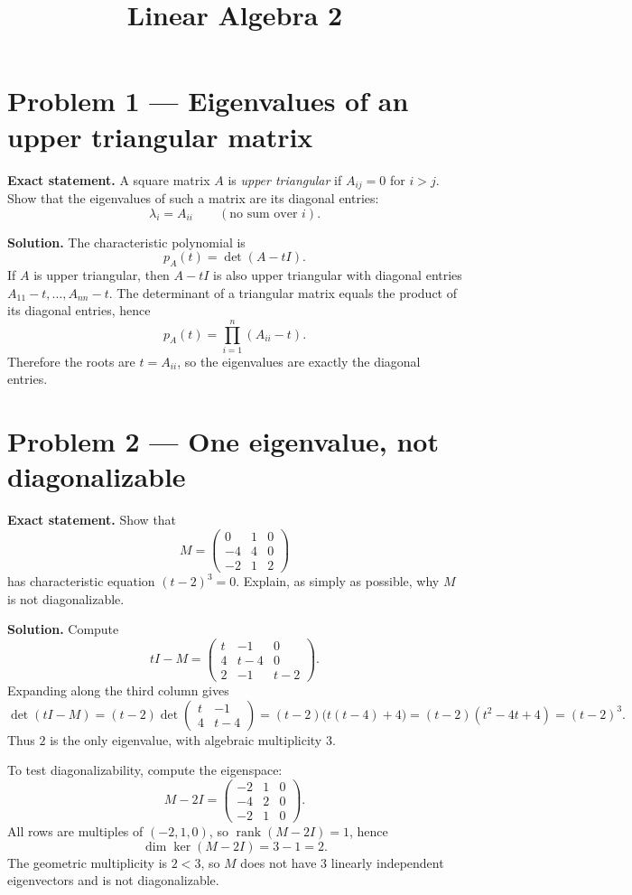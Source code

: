 \documentclass[12pt,a4paper]{article}
\title{Linear Algebra 2}
\author{}
\date{}
\theoremstyle{plain}
\theoremstyle{definition}      %
\begin{document}
	\maketitle

\section*{Problem 1 — Eigenvalues of an upper triangular matrix}

\textbf{Exact statement.}
A square matrix $A$ is \emph{upper triangular} if $A_{ij}=0$ for $i>j$.
Show that the eigenvalues of such a matrix are its diagonal entries:
\[
\lambda_i=A_{ii}\qquad(\text{no sum over }i).
\]

\textbf{Solution.}
The characteristic polynomial is
\[
p_A(t)=\det(A-tI).
\]
If $A$ is upper triangular, then $A-tI$ is also upper triangular with diagonal entries
$A_{11}-t,\dots,A_{nn}-t$. The determinant of a triangular matrix equals the product
of its diagonal entries, hence
\[
p_A(t)=\prod_{i=1}^n (A_{ii}-t).
\]
Therefore the roots are $t=A_{ii}$, so the eigenvalues are exactly the diagonal entries.

\section*{Problem 2 — One eigenvalue, not diagonalizable}

\textbf{Exact statement.}
Show that
\[
M=\begin{pmatrix}
	0&1&0\\
	-4&4&0\\
	-2&1&2
\end{pmatrix}
\]
has characteristic equation $(t-2)^3=0$. Explain, as simply as possible, why $M$ is not diagonalizable.

\textbf{Solution.}
Compute
\[
tI-M=\begin{pmatrix}
	t&-1&0\\
	4&t-4&0\\
	2&-1&t-2
\end{pmatrix}.
\]
Expanding along the third column gives
\[
\det(tI-M)=(t-2)\det\begin{pmatrix}t&-1\\4&t-4\end{pmatrix}
=(t-2)\bigl(t(t-4)+4\bigr)
=(t-2)(t^2-4t+4)=(t-2)^3.
\]
Thus $2$ is the only eigenvalue, with algebraic multiplicity $3$.

To test diagonalizability, compute the eigenspace:
\[
M-2I=\begin{pmatrix}
	-2&1&0\\
	-4&2&0\\
	-2&1&0
\end{pmatrix}.
\]
All rows are multiples of $(-2,1,0)$, so $\operatorname{rank}(M-2I)=1$, hence
\[
\dim\ker(M-2I)=3-1=2.
\]
The geometric multiplicity is $2<3$, so $M$ does not have $3$ linearly independent eigenvectors
and is not diagonalizable.
\end{document}
